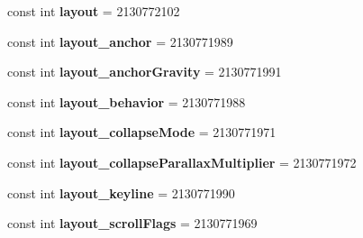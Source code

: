 \begin{DoxyCompactItemize}
\item 
\hypertarget{classClient_1_1Droid_1_1Resource_1_1Attribute_a1e21b5b094863428bd5db1cb0970c845}{}const int {\bfseries layout} = 2130772102\label{classClient_1_1Droid_1_1Resource_1_1Attribute_a1e21b5b094863428bd5db1cb0970c845}

\item 
\hypertarget{classClient_1_1Droid_1_1Resource_1_1Attribute_a1ba6a00cc774be7e562866079d0521d8}{}const int {\bfseries layout\+\_\+anchor} = 2130771989\label{classClient_1_1Droid_1_1Resource_1_1Attribute_a1ba6a00cc774be7e562866079d0521d8}

\item 
\hypertarget{classClient_1_1Droid_1_1Resource_1_1Attribute_a4be59662bbf3cd288e7243777dbe73ab}{}const int {\bfseries layout\+\_\+anchor\+Gravity} = 2130771991\label{classClient_1_1Droid_1_1Resource_1_1Attribute_a4be59662bbf3cd288e7243777dbe73ab}

\item 
\hypertarget{classClient_1_1Droid_1_1Resource_1_1Attribute_afeec984be798a5e3f64d4004074a6d41}{}const int {\bfseries layout\+\_\+behavior} = 2130771988\label{classClient_1_1Droid_1_1Resource_1_1Attribute_afeec984be798a5e3f64d4004074a6d41}

\item 
\hypertarget{classClient_1_1Droid_1_1Resource_1_1Attribute_af26f6e9ce195fd774729c0e1e2038274}{}const int {\bfseries layout\+\_\+collapse\+Mode} = 2130771971\label{classClient_1_1Droid_1_1Resource_1_1Attribute_af26f6e9ce195fd774729c0e1e2038274}

\item 
\hypertarget{classClient_1_1Droid_1_1Resource_1_1Attribute_ac3a38a47d14fbf1f4a99c62016d36c46}{}const int {\bfseries layout\+\_\+collapse\+Parallax\+Multiplier} = 2130771972\label{classClient_1_1Droid_1_1Resource_1_1Attribute_ac3a38a47d14fbf1f4a99c62016d36c46}

\item 
\hypertarget{classClient_1_1Droid_1_1Resource_1_1Attribute_ab8c27e2e79d82b33f1949245a070fcf0}{}const int {\bfseries layout\+\_\+keyline} = 2130771990\label{classClient_1_1Droid_1_1Resource_1_1Attribute_ab8c27e2e79d82b33f1949245a070fcf0}

\item 
\hypertarget{classClient_1_1Droid_1_1Resource_1_1Attribute_a77bf0e4909bd1e15dd4ece17b1f385c0}{}const int {\bfseries layout\+\_\+scroll\+Flags} = 2130771969\label{classClient_1_1Droid_1_1Resource_1_1Attribute_a77bf0e4909bd1e15dd4ece17b1f385c0}


\end{DoxyCompactItemize}
